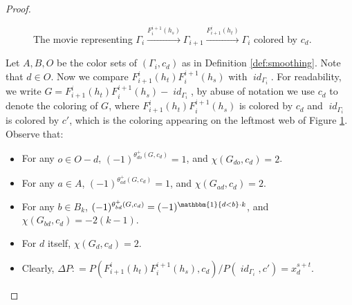 \documentclass[12pt]{amsart}
\theoremstyle{definition}
\theoremstyle{remark}
\numberwithin{equation}{section}
\numberwithin{figure}{section}
\DeclareMathOperator{\idfoam}{\mathit{id}}
\begin{document}
\begin{proof}
\begin{figure}[htbp]
    \caption{The movie representing $\Gamma_i\xrightarrow{F_i^{i+1}(h_s)}\Gamma_{i+1}\xrightarrow{F_{i+1}^i(h_t)}\Gamma_i$ colored by $c_d$.}
    \label{fig:ito(i+1)toi}
  \end{figure}
  Let $A,B,O$ be the color sets of $(\Gamma_i, c_d)$ as in Definition \ref{def:smoothing}. Note that $d\in O$. Now we compare $F_{i+1}^i(h_t)F_i^{i+1}(h_s)$ with $\idfoam_{\Gamma_i}$. For readability, we write $G =F_{i+1}^i(h_t)F_i^{i+1}(h_s) -  \idfoam_{\Gamma_i}$, by abuse of notation we use $c_d$ to denote the coloring of $G$, where $F_{i+1}^i(h_t)F_i^{i+1}(h_s)$ is colored by $c_d$ and $\idfoam_{\Gamma_i}$ is colored by $c'$, which is the coloring appearing on the leftmost web of Figure \ref{fig:ito(i+1)toi}. Observe that: 
  \begin{itemize}
    \item For any $o\in O- d$, $(-1)^{\theta^+_{do}(G, c_d)}=1$, and $\chi(G_{do}, c_d)=2$. 
    \item For any $a\in A$, $(-1)^{\theta^+_{ad}(G, c_d)}=1$, and $\chi(G_{ad}, c_d)=2$. 
    \item For any $b\in B_k$, $(-1)^{\theta^+_{bd}(G, c_d)}=(-1)^{\mathbbm{1}\{d<b\}\cdot k}$, and $\chi(G_{bd}, c_d)=-2(k-1)$. 
    \item For $d$ itself, $\chi(G_d, c_d)=2$.  
    \item Clearly, $\Delta P : = P(F_{i+1}^i(h_t)F_i^{i+1}(h_s), c_d)/P(\idfoam_{\Gamma_i}, c') =x_d^{s+t}$.
  \end{itemize}

\end{proof}
\end{document}
